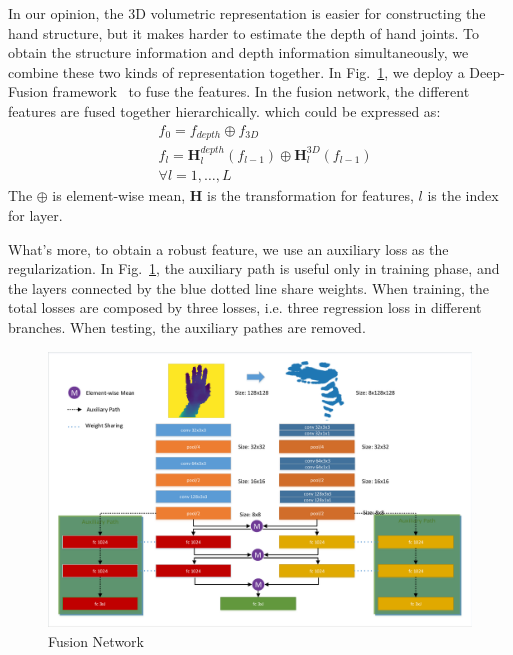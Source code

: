 \documentclass[journal,comsoc]{IEEEtran}
\let\MYoriglatexcaption\caption
\renewcommand{\caption}[2][\relax]{\MYoriglatexcaption[#2]{#2}}
\begin{document}
In our opinion, the 3D volumetric representation is easier for constructing the hand structure, but it makes harder to estimate
the depth of hand joints. To obtain the structure information and depth information simultaneously, we combine these two kinds
of representation together. In Fig.~\ref{fig:fusion network}, we deploy a Deep-Fusion framework~\cite{chen2016multi} to fuse
the features. In the fusion network, the different features are fused together hierarchically. which could be expressed as:
\begin{equation}\label{eq:deep fusion}
\begin{aligned}
&f_0 = f_{depth} \oplus f_{3D} \\
&f_l = \textbf{H}_l^{depth}(f_{l-1}) \oplus \textbf{H}_l^{3D}(f_{l-1}) \\
&\forall l=1, \dots , L
\end{aligned}
\end{equation}
The $\oplus$ is element-wise mean, $\textbf{H}$ is the transformation for features, $l$ is the index for layer.

What's more, to obtain a robust feature, we use an auxiliary loss as the regularization. In Fig.~\ref{fig:fusion network},
the auxiliary path is useful only in training phase, and the layers connected by the blue dotted line share weights.
When training, the total losses are composed by three losses, i.e. three regression loss in different branches.
When testing, the auxiliary pathes are removed.
\begin{figure}[t]
    \centering
    \includegraphics[width=1\linewidth]{src/network/fusion.pdf}
    \caption{Fusion Network}
\label{fig:fusion network}
\end{figure}
\end{document}
